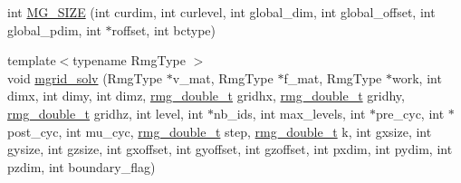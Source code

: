 \begin{DoxyCompactItemize}
\item 
int \hyperlink{class_mgrid_af9a3bb482acf4ac418310165186210c6}{M\-G\-\_\-\-S\-I\-Z\-E} (int curdim, int curlevel, int global\-\_\-dim, int global\-\_\-offset, int global\-\_\-pdim, int $\ast$roffset, int bctype)
\item 
{\footnotesize template$<$typename Rmg\-Type $>$ }\\void \hyperlink{class_mgrid_a3b318c831f224cb34b7a3486c8194c72}{mgrid\-\_\-solv} (Rmg\-Type $\ast$v\-\_\-mat, Rmg\-Type $\ast$f\-\_\-mat, Rmg\-Type $\ast$work, int dimx, int dimy, int dimz, \hyperlink{rmgtypes_8h_aaa16921c14f121c56eaa42390a340db8}{rmg\-\_\-double\-\_\-t} gridhx, \hyperlink{rmgtypes_8h_aaa16921c14f121c56eaa42390a340db8}{rmg\-\_\-double\-\_\-t} gridhy, \hyperlink{rmgtypes_8h_aaa16921c14f121c56eaa42390a340db8}{rmg\-\_\-double\-\_\-t} gridhz, int level, int $\ast$nb\-\_\-ids, int max\-\_\-levels, int $\ast$pre\-\_\-cyc, int $\ast$post\-\_\-cyc, int mu\-\_\-cyc, \hyperlink{rmgtypes_8h_aaa16921c14f121c56eaa42390a340db8}{rmg\-\_\-double\-\_\-t} step, \hyperlink{rmgtypes_8h_aaa16921c14f121c56eaa42390a340db8}{rmg\-\_\-double\-\_\-t} k, int gxsize, int gysize, int gzsize, int gxoffset, int gyoffset, int gzoffset, int pxdim, int pydim, int pzdim, int boundary\-\_\-flag)
\end{DoxyCompactItemize}


